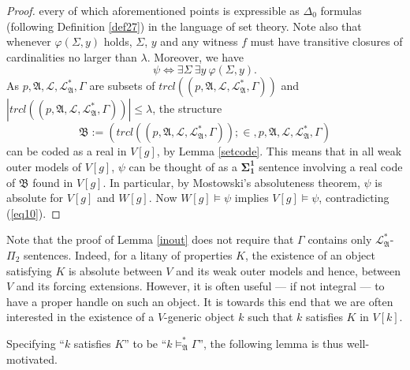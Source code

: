 \documentclass[12pt]{article}
\numberwithin{equation}{section}
\begin{document}
\begin{proof}
every of which aforementioned points is expressible as $\Delta_0$ formulas (following Definition \ref{def27}) in the language of set theory. Note also that whenever $\varphi(\Sigma, y)$ holds, $\Sigma$, $y$ and any witness $f$ must have transitive closures of cardinalities no larger than $\lambda$. Moreover, we have $$\psi \iff \exists \Sigma \ \exists y \ \varphi(\Sigma, y).$$ As $p, \mathfrak{A}, \mathcal{L}, \mathcal{L}^*_{\mathfrak{A}}, \Gamma$ are subsets of $trcl((p, \mathfrak{A}, \mathcal{L}, \mathcal{L}^*_{\mathfrak{A}}, \Gamma))$ and $|trcl((p, \mathfrak{A}, \mathcal{L}, \mathcal{L}^*_{\mathfrak{A}}, \Gamma))| \leq \lambda$, the structure $$\mathfrak{B} := (trcl((p, \mathfrak{A}, \mathcal{L}, \mathcal{L}^*_{\mathfrak{A}}, \Gamma)); \in, p, \mathfrak{A}, \mathcal{L}, \mathcal{L}^*_{\mathfrak{A}}, \Gamma)$$ can be coded as a real in $V[g]$, by Lemma \ref{setcode}. This means that in all weak outer models of $V[g]$, $\psi$ can be thought of as a $\mathbf{\Sigma^1_1}$ sentence involving a real code of $\mathfrak{B}$ found in $V[g]$. In particular, by Mostowski's absoluteness theorem, $\psi$ is absolute for $V[g]$ and $W[g]$. Now $W[g] \models \psi$ implies $V[g] \models \psi$, contradicting (\ref{eq10}).
\end{proof}

Note that the proof of Lemma \ref{inout} does not require that $\Gamma$ contains only $\mathcal{L}^*_{\mathfrak{A}}$-$\Pi_2$ sentences. Indeed, for a litany of properties $K$, the existence of an object satisfying $K$ is absolute between $V$ and its weak outer models and hence, between $V$ and its forcing extensions. However, it is often useful --- if not integral --- to have a proper handle on such an object. It is towards this end that we are often interested in the existence of a $V$-generic object $k$ such that $k$ satisfies $K$ in $V[k]$.

Specifying ``$k$ satisfies $K$'' to be ``$k \models^{*}_{\mathfrak{A}} \Gamma$'', the following lemma is thus well-motivated. 
\end{document}
